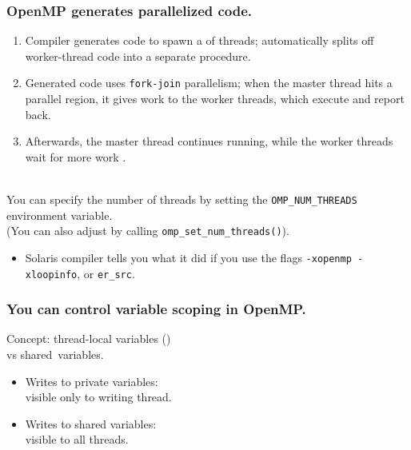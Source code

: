 \begin{frame}[containsverbatim]
  \frametitle{OpenMP generates parallelized code.}

  \begin{enumerate}
    \item Compiler generates code to spawn a 
of threads; automatically splits off worker-thread code into a
separate procedure.
    \item Generated code uses {\tt fork-join} parallelism; when the
master thread hits a parallel region, it gives work to the worker
threads, which execute and report back.
    \item Afterwards, the master thread
continues running, while the worker threads wait for more work .
  \end{enumerate}

\begin{changemargin}{1cm}
~\\
You can specify the number of threads by setting the
\verb+OMP_NUM_THREADS+ environment variable. \\

(You can also adjust by calling 
\verb+omp_set_num_threads()+).

\begin{itemize}
  \item Solaris compiler tells you what it did if you use the flags \verb+-xopenmp -xloopinfo+, or \verb+er_src+.
\end{itemize}
\end{changemargin}
  


\end{frame}

\begin{frame}[fragile]
  \frametitle{You can control variable scoping in OpenMP.}

  
\begin{changemargin}{1.5cm}
\Large
  Concept: thread-local variables ()\\
    \hspace*{4em}  vs shared~variables.
  \begin{itemize}
    \item Writes to private variables:\\
\qquad visible only to writing thread.
    \item Writes to shared variables:\\ 
\qquad visible to all threads.
  \end{itemize}
\end{changemargin}
  

\end{frame}


